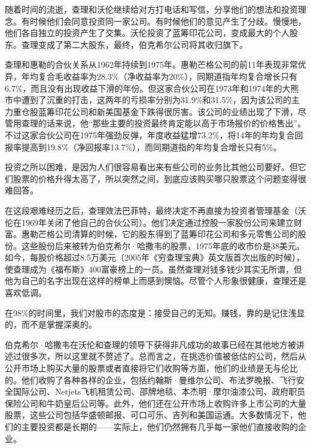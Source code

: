 随着时间的流逝，查理和沃伦继续给对方打电话和写信，分享他们的想法和投资理念。有时候他们会同意投资同一家公司。有时候他们的意见产生了分歧。慢慢地，他们各自独立的投资产生了交集。沃伦投资了蓝筹印花公司，变成最大的个人股东。查理变成了第二大股东，最终，伯克希尔公司将其收归旗下。
\par

查理和惠勒的合伙关系从1962年持续到1975年。惠勒芒格公司的前11年表现非常优异，年均复合毛收益率为28.3\%（净收益率为20\%），同期道指年均复合增长只有6.7\%，而且没有出现收益下滑的年份。但这家合伙公司在1973年和1974年的大熊市中遭到了沉重的打击，这两年的亏损率分别为31.9\%和31.5\%，因为该公司的主力重仓股蓝筹印花公司和新美国基金下跌得很厉害。该公司的业绩出现了下滑，尽管用查理的话来说，他“那些主要的投资最终肯定能以高于市场报价的价格售出”。不过这家合伙公司在1975年强劲反弹，年度收益猛增73.2\%，将14年的年均复合回报率提高到19.8\%（净回报率13.7\%），而同期道指的年均复合增长只有5\%。
\par

\begin{WisdomBox}
\par

投资之所以困难，是因为人们很容易看出来有些公司的业务比其他公司要好。但它们股票的价格升得太高了，所以突然之间，到底应该购买哪只股票这个问题变得很难回答。
\par
\end{WisdomBox}

在这段艰难经历之后，查理效法巴菲特，最终决定不再直接为投资者管理基金（沃伦在1969年关闭了他自己的合伙公司）。他们决定通过控股一家股份公司来建立财富。惠勒芒格公司清算的时候，它的股东得到了蓝筹印花公司和多元零售公司的股份。这些股份后来被转为伯克希尔·哈撒韦的股票，1975年底的收市价是38美元。如今，每股价格超过8.5万美元（2005年《穷查理宝典》英文版首次出版的时候），使查理成为《福布斯》400富豪榜上的一员。虽然查理对钱多钱少其实无所谓，但他为自己的名字出现在这样的榜单上而感到懊恼。尽管个人形象很健康，查理还是喜欢低调。
\par

\begin{WisdomBox}
\par

在98\%的时间里，我们对股市的态度是：接受自己的无知。赚钱，靠的是记住浅显的，而不是掌握深奥的。
\par
\end{WisdomBox}

伯克希尔·哈撒韦在沃伦和查理的领导下获得非凡成功的故事已经在其他地方被讲述过很多次，所以这里就不赘述了。总而言之，在挑选价值被低估的公司，然后从公开市场上购买大量的股票或者直接将它们收购等方面，他们的业绩是无与伦比的。他们收购了各种各样的企业，包括约翰斯·曼维尔公司、布法罗晚报、飞行安全国际公司、Netjets飞机租赁公司、邵牌地毯、本杰明·摩尔油漆公司、政府职员保险公司和牛奶皇后公司等。此外，他们还在公开市场上收购许多上市公司的大量股票，这些公司包括华盛顿邮报、可口可乐、吉列和美国运通。大多数情况下，他们的主要投资都是长期的——实际上，他们仍然拥有几乎每一家他们直接收购的企业。
\par

